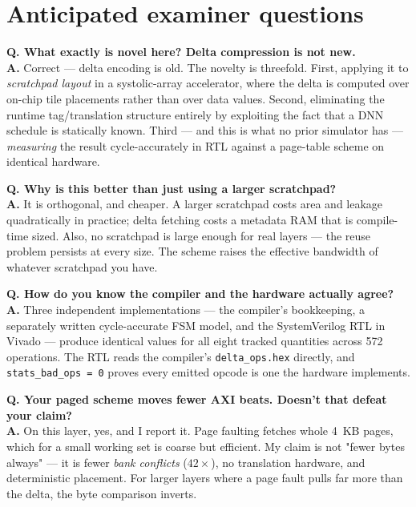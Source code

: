 \documentclass[11pt,a4paper]{article}
\begin{document}
\section{Anticipated examiner questions}
\label{sec:viva}

\newcommand{\qa}[2]{\vspace{4pt}\noindent\textbf{\textcolor{stampblue}{Q.}
  #1}\\[2pt]\textbf{A.} #2\vspace{3pt}}

\qa{What exactly is novel here? Delta compression is not new.}{
Correct --- delta encoding is old. The novelty is threefold. First, applying it
to \emph{scratchpad layout} in a systolic-array accelerator, where the delta is
computed over on-chip tile placements rather than over data values. Second,
eliminating the runtime tag/translation structure entirely by exploiting the
fact that a DNN schedule is statically known. Third --- and this is what no
prior simulator has --- \emph{measuring} the result cycle-accurately in RTL
against a page-table scheme on identical hardware.}

\qa{Why is this better than just using a larger scratchpad?}{
It is orthogonal, and cheaper. A larger scratchpad costs area and leakage
quadratically in practice; delta fetching costs a metadata RAM that is
compile-time sized. Also, no scratchpad is large enough for real layers --- the
reuse problem persists at every size. The scheme raises the effective bandwidth
of whatever scratchpad you have.}

\qa{How do you know the compiler and the hardware actually agree?}{
Three independent implementations --- the compiler's bookkeeping, a separately
written cycle-accurate FSM model, and the SystemVerilog RTL in Vivado --- produce
identical values for all eight tracked quantities across 572 operations.
The RTL reads the compiler's \texttt{delta\_ops.hex} directly, and
\texttt{stats\_bad\_ops = 0} proves every emitted opcode is one the hardware
implements.}

\qa{Your paged scheme moves fewer AXI beats. Doesn't that defeat your claim?}{
On this layer, yes, and I report it. Page faulting fetches whole 4~KB pages,
which for a small working set is coarse but efficient. My claim is not "fewer
bytes always" --- it is fewer \emph{bank conflicts} ($42\times$), no
translation hardware, and deterministic placement. For larger layers where a
page fault pulls far more than the delta, the byte comparison inverts.}
\end{document}
